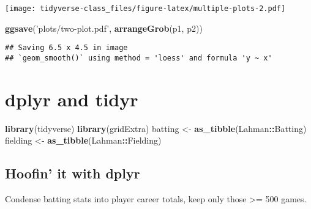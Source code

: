 \documentclass[]{book}
\newenvironment{Shaded}{\begin{snugshade}}{\end{snugshade}}
\newcommand{\KeywordTok}[1]{\textcolor[rgb]{0.13,0.29,0.53}{\textbf{#1}}}
\newcommand{\DataTypeTok}[1]{\textcolor[rgb]{0.13,0.29,0.53}{#1}}
\newcommand{\DecValTok}[1]{\textcolor[rgb]{0.00,0.00,0.81}{#1}}
\newcommand{\StringTok}[1]{\textcolor[rgb]{0.31,0.60,0.02}{#1}}
\newcommand{\OperatorTok}[1]{\textcolor[rgb]{0.81,0.36,0.00}{\textbf{#1}}}
\newcommand{\NormalTok}[1]{#1}
\begin{document}
\texttt{[image: tidyverse-class\_files/figure-latex/multiple-plots-2.pdf]}

\begin{Shaded}
\begin{Highlighting}[]
\KeywordTok{ggsave}\NormalTok{(}\StringTok{'plots/two-plot.pdf'}\NormalTok{, }\KeywordTok{arrangeGrob}\NormalTok{(p1, p2))}
\end{Highlighting}
\end{Shaded}

\begin{verbatim}
## Saving 6.5 x 4.5 in image
## `geom_smooth()` using method = 'loess' and formula 'y ~ x'
\end{verbatim}

\chapter{dplyr and tidyr}\label{ch:dplyr}

\begin{Shaded}
\begin{Highlighting}[]
\KeywordTok{library}\NormalTok{(tidyverse)}
\KeywordTok{library}\NormalTok{(gridExtra)}
\NormalTok{batting <-}\StringTok{ }\KeywordTok{as_tibble}\NormalTok{(Lahman}\OperatorTok{::}\NormalTok{Batting)}
\NormalTok{fielding <-}\StringTok{ }\KeywordTok{as_tibble}\NormalTok{(Lahman}\OperatorTok{::}\NormalTok{Fielding)}
\end{Highlighting}
\end{Shaded}

\section{Hoofin' it with dplyr}\label{hoofin-it-with-dplyr}

Condense batting stats into player career totals, keep only those
\textgreater{}= 500 games.

\begin{Shaded}
\end{Shaded}
\end{document}
